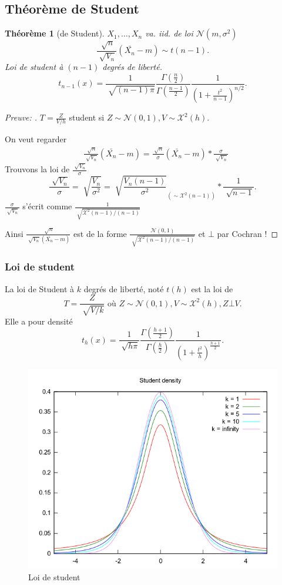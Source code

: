 \documentclass{article}
\theoremstyle{plain}%
\newtheorem{thm}{Théorème}[section]
\theoremstyle{definition}
\theoremstyle{remark}
\begin{document}
\subsection{Théorème de Student}

\begin{thm}[de Student]
    $ X_1, \dots, X_n  $ va. iid. de loi $ \mathcal{N}(m, \sigma ^2) $ 
    \[
        \frac{\sqrt[]{n}}{\sqrt[]{V_n}} (\bar{X_n} - m) \sim t(n-1)
    .\]
    Loi de student à $ (n-1) $ degrés de liberté.
    \[
        t_{n-1}(x) = \frac{1}{\sqrt[]{(n-1) \pi }} \frac{\Gamma (\frac{n}{2})}{\Gamma (\frac{n-1}{2})} \frac{1}{(1 + \frac{t^2}{n-1}) ^{n/2}}
    .\]
\end{thm}
\begin{proof}[Preuve: ]
    $ T = \frac{Z}{V/h} $ student si $ Z \sim \mathcal{N}(0,1), V \sim \mathcal{X}^2(h) $. 

    On veut regarder 
    \begin{align*}
        &\frac{\sqrt[]{n}}{\sqrt[]{V_n}} (\bar{X_n} - m) = \frac{\sqrt[]{n}}{\sigma }(\bar{X_n} - m) * \frac{\sigma }{\sqrt[]{V_n}} 
    \end{align*}
    Trouvons la loi de $ \frac{\sqrt[]{V_n}}{\sigma } $
    \[
        \frac{\sqrt[]{V_n}}{\sigma } = \sqrt[]{\frac{V_n}{\sigma ^2}} = \sqrt[]{\frac{V_n (n-1)}{\sigma ^2}}_{(\sim \mathcal{X}^2(n-1))} * \frac{1}{\sqrt[]{n-1}}
    .\]
    $ \frac{\sigma }{\sqrt[]{V_n}} $ s'écrit comme $ \frac{1}{\sqrt[]{\mathcal{X}^2 (n-1) / (n-1)}} $ 

    Ainsi $ \frac{\sqrt[]{n}}{\sqrt[]{V_n} (\bar{X_n} - m )} $ est de la forme $ \frac{\mathcal{N}(0,1)}{\sqrt[]{\mathcal{X}^2 (n-1) / (n-1)}} $ et $ \bot $ par Cochran !
\end{proof}



\subsubsection{Loi de student}
    La loi de Student à $ k $ degrés de liberté, noté $ t(h) $ est la loi de 
    \[
        T = \frac{Z}{\sqrt[]{V/k}} \text{ où } Z \sim \mathcal{N}(0,1), V \sim \mathcal{X}^2 (h), Z \bot V
    .\]
    Elle a pour densité 
    \[
        t_h(x) = \frac{1}{\sqrt[]{h \pi }} \frac{\Gamma (\frac{h+1}{2})}{\Gamma (\frac{h}{2})} \frac{1}{(1 + \frac{t^2}{h})^{\frac{h+1}{2}}}
    .\]

    \begin{figure}[!htbp]
        \centering
        \includegraphics*[width=.5\textwidth]{./figures/Student_density.png}
        \caption{Loi de student}
    \end{figure}
\end{document}

